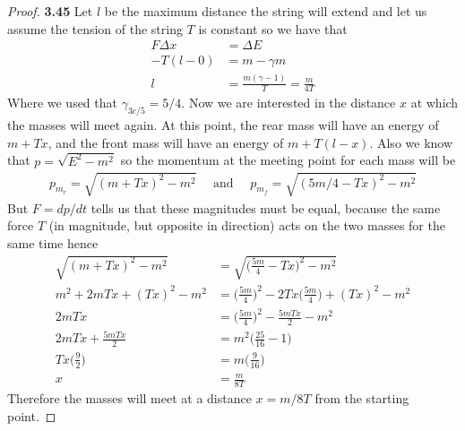 \documentclass[11pt]{article}
\theoremstyle{definition}
\begin{document}
\begin{proof}{\textbf{3.45}}
    Let $l$ be the maximum distance the string will extend and let us assume
    the tension of the string $T$ is constant so we have that
    \begin{align*}
        F\Delta x &= \Delta E\\
        -T (l - 0) &= m - \gamma m\\
        l &= \frac{m(\gamma - 1)}{T} = \frac{m}{4T}
    \end{align*}
    Where we used that $\gamma_{3c/5} = 5/4$.
    Now we are interested in the distance $x$ at which the masses will meet
    again. At this point, the rear mass will have an energy of $m + Tx$,
    and the front mass will have an energy of $m + T(l - x)$.
    Also we know that $p = \sqrt{E^2 - m^2}$ so the momentum at the meeting
    point for each mass will be
    \begin{align*}
        p_{m_r} = \sqrt{(m + Tx)^2 - m^2}
        \quad\text{ and }\quad
        p_{m_f} = \sqrt{(5m/4 - Tx)^2 - m^2}
    \end{align*}
    But $F = dp/dt$ tells us that these magnitudes must be equal, because the
    same force $T$ (in magnitude, but opposite in direction) acts on the two
    masses for the same time hence
    \begin{align*}
        \sqrt{(m + Tx)^2 - m^2} &= \sqrt{\bigg(\frac{5m}{4} - Tx\bigg)^2 - m^2}\\
        m^2 + 2mTx + (Tx)^2 - m^2
        &= \bigg(\frac{5m}{4}\bigg)^2 - 2Tx\bigg(\frac{5m}{4}\bigg) + (Tx)^2 - m^2\\
        2mTx &= \bigg(\frac{5m}{4}\bigg)^2 - \frac{5mTx}{2}  - m^2\\
        2mTx + \frac{5mTx}{2} &= m^2\bigg(\frac{25}{16} - 1\bigg)\\
        Tx\bigg(\frac{9}{2}\bigg) &= m\bigg(\frac{9}{16}\bigg)\\
        x &= \frac{m}{8T}
    \end{align*}
    Therefore the masses will meet at a distance $x = m/8T$ from the starting
    point.
\end{proof}
\end{document}
